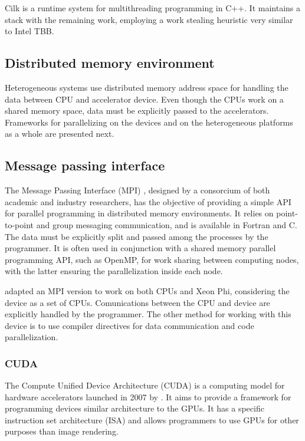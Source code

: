 Cilk is a runtime system for multithreading programming in C++. It maintains a stack with the remaining work, employing a work stealing heuristic very similar to Intel TBB.

\subsection{Distributed memory environment}
\label{HeterogeneousFrameworks}

Heterogeneous systems use distributed memory address space for handling the data between CPU and accelerator device. Even though the CPUs work on a shared memory space, data must be explicitly passed to the accelerators. Frameworks for parallelizing on the devices and on the heterogeneous platforms as a whole are presented next.

\subsection*{Message passing interface}
\label{MPI}

The Message Passing Interface (MPI) \cite{MPI}, designed by a consorcium of both academic and industry researchers, has the objective of providing a simple API for parallel programming in distributed memory environments. It relies on point-to-point and group messaging communication, and is available in Fortran and C. The data must be explicitly split and passed among the processes by the programmer. It is often used in conjunction with a shared memory parallel programming API, such as OpenMP, for work sharing between computing nodes, with the latter ensuring the parallelization inside each node.

\intel adapted an MPI version to work on both CPUs and Xeon Phi, considering the device as a set of CPUs. Comunications between the CPU and device are explicitly handled by the programmer. The other method for working with this device is to use compiler directives for data communication and code parallelization.

\subsubsection*{CUDA}
\label{CUDA}

The Compute Unified Device Architecture (CUDA) is a computing model for hardware accelerators launched in 2007 by \nvidia. It aims to provide a framework for programming devices similar architecture to the \nvidia GPUs. It has a specific instruction set architecture (ISA) and allows programmers to use GPUs for other purposes than image rendering.

